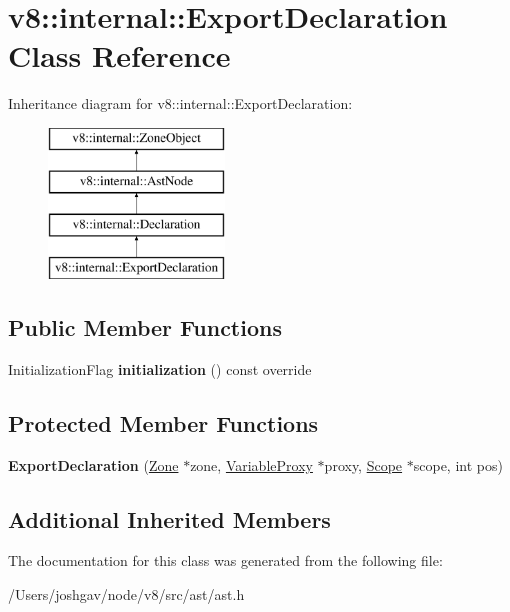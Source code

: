 \hypertarget{classv8_1_1internal_1_1_export_declaration}{}\section{v8\+:\+:internal\+:\+:Export\+Declaration Class Reference}
\label{classv8_1_1internal_1_1_export_declaration}
Inheritance diagram for v8\+:\+:internal\+:\+:Export\+Declaration\+:\begin{figure}[H]
\begin{center}
\leavevmode
\includegraphics[height=4.000000cm]{classv8_1_1internal_1_1_export_declaration}
\end{center}
\end{figure}
\subsection*{Public Member Functions}
\begin{DoxyCompactItemize}
\item 
Initialization\+Flag {\bfseries initialization} () const  override\hypertarget{classv8_1_1internal_1_1_export_declaration_a7c9161da9dac3012815bfe1bc03e45a0}{}\label{classv8_1_1internal_1_1_export_declaration_a7c9161da9dac3012815bfe1bc03e45a0}

\end{DoxyCompactItemize}
\subsection*{Protected Member Functions}
\begin{DoxyCompactItemize}
\item 
{\bfseries Export\+Declaration} (\hyperlink{classv8_1_1internal_1_1_zone}{Zone} $\ast$zone, \hyperlink{classv8_1_1internal_1_1_variable_proxy}{Variable\+Proxy} $\ast$proxy, \hyperlink{classv8_1_1internal_1_1_scope}{Scope} $\ast$scope, int pos)\hypertarget{classv8_1_1internal_1_1_export_declaration_a6d8913c49f0c4dee5b6bb791ad652c40}{}\label{classv8_1_1internal_1_1_export_declaration_a6d8913c49f0c4dee5b6bb791ad652c40}

\end{DoxyCompactItemize}
\subsection*{Additional Inherited Members}


The documentation for this class was generated from the following file\+:\begin{DoxyCompactItemize}
\item 
/\+Users/joshgav/node/v8/src/ast/ast.\+h\end{DoxyCompactItemize}
